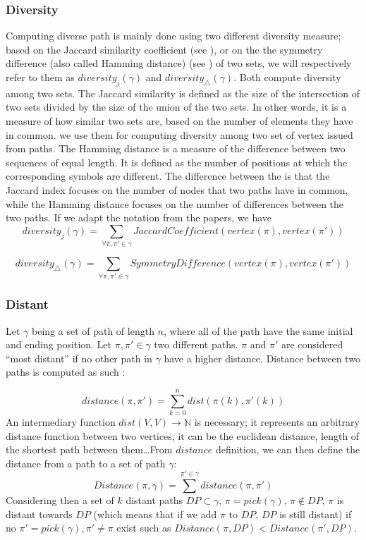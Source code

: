 \subsubsection{Diversity}\label{sec:diversity}

Computing diverse path is mainly done using two different diversity measure; based on the Jaccard similarity coefficient (see \cite{habochal21a}), or on the the symmetry difference (also called Hamming distance) (see \cite{hanaka2022computing}) of two sets, we will respectively refer to them as \(diversity_j(\gamma)\) and \(diversity_{\bigtriangleup}(\gamma)\). Both compute diversity among two sets. The Jaccard similarity is defined as the size of the intersection of two sets divided by the size of the union of the two sets. In other words, it is a measure of how similar two sets are, based on the number of elements they have in common. we use them for computing diversity among two set of vertex issued from paths. The Hamming distance is a measure of the difference between two sequences of equal length. It is defined as the number of positions at which the corresponding symbols are different. The difference between the is that the Jaccard index focuses on the number of nodes that two paths have in common, while the Hamming distance focuses on the number of differences between the two paths. If we adapt the notation from the papers, we have
\[
  diversity_j(\gamma)=\sum_{\forall \pi,\pi' \in \gamma}{JaccardCoefficient(vertex(\pi),vertex(\pi'))}
\]

\[
  diversity_{\bigtriangleup}(\gamma)=\sum_{\forall \pi,\pi' \in \gamma}{SymmetryDifference(vertex(\pi),vertex(\pi'))}
\]  





\subsubsection{Distant}\label{sec:distant}
Let \(\gamma\) being a set of path of length \(n\), where all of the path have the same initial and ending position. Let \(\pi,\pi' \in \gamma\) two different paths. \(\pi\) and \(\pi'\) are considered ``most distant'' if no other path in \(\gamma\) have a higher distance. Distance between two paths is computed as such :


\[
  distance(\pi,\pi') = \sum_{k=0}^{n}{dist(\pi(k),\pi'(k))}   
 \] An intermediary function \(dist(V,V) \rightarrow \mathbb{N}\) is necessary; it represents an arbitrary distance function between two vertices, it can be the euclidean distance, length of the shortest path between them\ldots From \(distance\) definition, we can then define the distance from a path to a set of path \(\gamma\): \[
  Distance(\pi,\gamma) = \sum^{\pi'\in\gamma}{distance(\pi,\pi')}   
\] Considering then a set of \(k\) distant paths \(DP \subset \gamma \), \(\pi = pick(\gamma)\), \(\pi \notin DP \), \(\pi\) is distant towards \(DP\) (which means that if we add \(\pi\) to \(DP\), \(DP\) is still distant) if no \(\pi' = pick(\gamma), \pi' \neq \pi\) exist such as \( Distance(\pi,DP) < Distance(\pi',DP)\).

